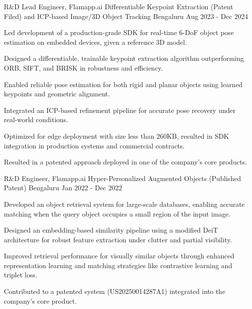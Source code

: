 \begin{cventries}
  \cventry
    {R\&D Lead Engineer, Flamapp.ai} %
    {Differentiable Keypoint Extraction (Patent Filed) and ICP-based Image/3D Object Tracking} %
    {Bengaluru} %
    {Aug 2023 - Dec 2024} %
    {
      \begin{cvitems}
        \item Led development of a production-grade SDK for real-time 6-DoF object pose estimation on embedded devices, given a reference 3D model.
        \item Designed a differentiable, trainable keypoint extraction algorithm outperforming ORB, SIFT, and BRISK in robustness and efficiency.
        \item Enabled reliable pose estimation for both rigid and planar objects using learned keypoints and geometric alignment.
        \item Integrated an ICP-based refinement pipeline for accurate pose recovery under real-world conditions.
        \item Optimized for edge deployment with size less than 260KB, resulted in SDK integration in production systems and commercial contracts.
        \item Resulted in a patented approach deployed in one of the company’s core products.
      \end{cvitems}
    }

  \cventry
    {R\&D Engineer, Flamapp.ai} %
    {Hyper-Personalized Augmented Objects (Published Patent)} %
    {Bengaluru} %
    {Jan 2022 - Dec 2022} %
    {
      \begin{cvitems}
        \item Developed an object retrieval system for large-scale databases, enabling accurate matching when the query object occupies a small region of the input image.
        \item Designed an embedding-based similarity pipeline using a modified DeiT architecture for robust feature extraction under clutter and partial visibility.
        \item Improved retrieval performance for visually similar objects through enhanced representation learning and matching strategies like contrastive learning and triplet loss.
        \item Contributed to a patented system (US20250014287A1) integrated into the company’s core product.
      \end{cvitems}
    }


\end{cventries}
